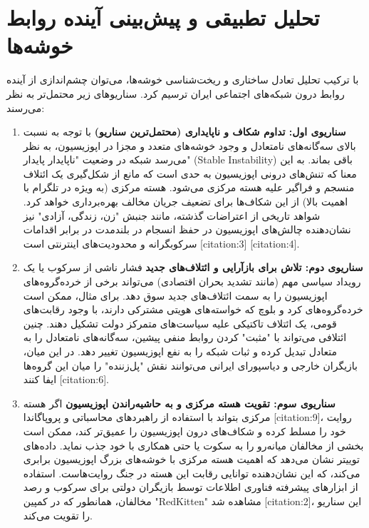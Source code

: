 \documentclass{article}
\begin{document}
	\section{تحلیل تطبیقی و پیش‌بینی آینده روابط خوشه‌ها}
	با ترکیب تحلیل تعادل ساختاری و ریخت‌شناسی خوشه‌ها، می‌توان چشم‌اندازی از آینده روابط درون شبکه‌های اجتماعی ایران ترسیم کرد. سناریوهای زیر محتمل‌تر به نظر می‌رسند:
	
	\begin{enumerate}
		\item \textbf{سناریوی اول: تداوم شکاف و ناپایداری (محتمل‌ترین سناریو)} با توجه به نسبت بالای سه‌گانه‌های نامتعادل و وجود خوشه‌های متعدد و مجزا در اپوزیسیون، به نظر می‌رسد شبکه در وضعیت "ناپایدار پایدار" (Stable Instability) باقی بماند. به این معنا که تنش‌های درونی اپوزیسیون به حدی است که مانع از شکل‌گیری یک ائتلاف منسجم و فراگیر علیه هسته مرکزی می‌شود. هسته مرکزی (به ویژه در تلگرام با اهمیت بالا) از این شکاف‌ها برای تضعیف جریان مخالف بهره‌برداری خواهد کرد. شواهد تاریخی از اعتراضات گذشته، مانند جنبش "زن، زندگی، آزادی" نیز نشان‌دهنده چالش‌های اپوزیسیون در حفظ انسجام در بلندمدت در برابر اقدامات سرکوبگرانه و محدودیت‌های اینترنتی است [citation:3] [citation:4].
		
		\item \textbf{سناریوی دوم: تلاش برای بازآرایی و ائتلاف‌های جدید} فشار ناشی از سرکوب یا یک رویداد سیاسی مهم (مانند تشدید بحران اقتصادی) می‌تواند برخی از خرده‌گروه‌های اپوزیسیون را به سمت ائتلاف‌های جدید سوق دهد. برای مثال، ممکن است خرده‌گروه‌های کرد و بلوچ که خواسته‌های هویتی مشترکی دارند، با وجود رقابت‌های قومی، یک ائتلاف تاکتیکی علیه سیاست‌های متمرکز دولت تشکیل دهند. چنین ائتلافی می‌تواند با "مثبت" کردن روابط منفی پیشین، سه‌گانه‌های نامتعادل را به متعادل تبدیل کرده و ثبات شبکه را به نفع اپوزیسیون تغییر دهد. در این میان، بازیگران خارجی و دیاسپورای ایرانی می‌توانند نقش "پل‌زننده" را میان این گروه‌ها ایفا کنند [citation:6].
		
		\item \textbf{سناریوی سوم: تقویت هسته مرکزی و به حاشیه‌راندن اپوزیسیون} اگر هسته مرکزی بتواند با استفاده از راهبردهای محاسباتی و پروپاگاندا [citation:9]، روایت خود را مسلط کرده و شکاف‌های درون اپوزیسیون را عمیق‌تر کند، ممکن است بخشی از مخالفان میانه‌رو را به سکوت یا حتی همکاری با خود جذب نماید. داده‌های توییتر نشان می‌دهد که اهمیت هسته مرکزی با خوشه‌های بزرگ اپوزیسیون برابری می‌کند، که این نشان‌دهنده توانایی رقابت این هسته در جنگ روایت‌هاست. استفاده از ابزارهای پیشرفته فناوری اطلاعات توسط بازیگران دولتی برای سرکوب و رصد مخالفان، همانطور که در کمپین "RedKitten" مشاهده شد [citation:2]، این سناریو را تقویت می‌کند.
	\end{enumerate}
	
\end{document}
